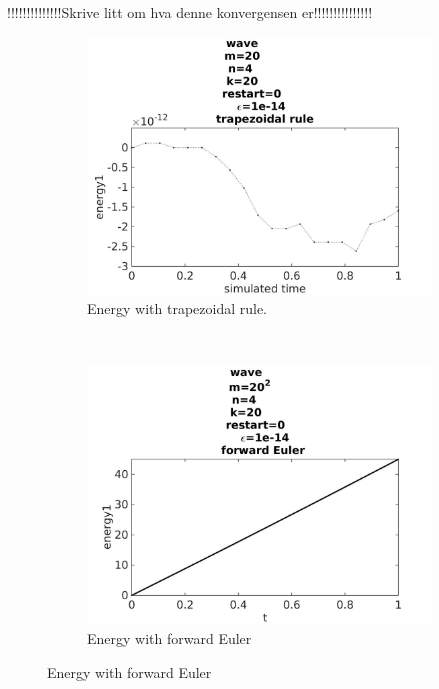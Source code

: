 !!!!!!!!!!!!!!Skrive litt om hva denne konvergensen er!!!!!!!!!!!!!!!\\
\begin{figure}[H]
        \centering
        \begin{subfigure}[b]{0.30\textwidth}
                \includegraphics[width=\textwidth]{../MATLAB/fig/energyovertimetrapezoidal.jpg}
                \caption{ Energy with trapezoidal rule. }
                \label{fig:energyovertimetrapezoidal}
        \end{subfigure}%
        ~
        \begin{subfigure}[b]{0.30\textwidth}
                \includegraphics[width=\textwidth]{../MATLAB/fig/energyovertimeeuler.jpg}
                \caption{ Energy with forward Euler }

\end{subfigure}
\end{figure}
